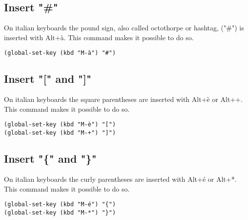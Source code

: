 \documentclass[11pt]{article}
\begin{document}
\subsection{Insert "\#"}
\label{sec:orga858cd0}
On italian keyboards the pound sign, also called octothorpe or hashtag, ("\#") is inserted with Alt+à. This command makes it possible to do so.
\begin{verbatim}
(global-set-key (kbd "M-à") "#")
\end{verbatim}
\subsection{Insert "[" and "]"}
\label{sec:org4a5dbec}
On italian keyboards the square parentheses are inserted with Alt+è or Alt++. This command makes it possible to do so.
\begin{verbatim}
(global-set-key (kbd "M-è") "[")
(global-set-key (kbd "M-+") "]")
\end{verbatim}
\subsection{Insert "\{" and "\}"}
\label{sec:org1eda247}
On italian keyboards the curly parentheses are inserted with Alt+é or Alt+*. This command makes it possible to do so.
\begin{verbatim}
(global-set-key (kbd "M-é") "{")
(global-set-key (kbd "M-*") "}")
\end{verbatim}
\end{document}
